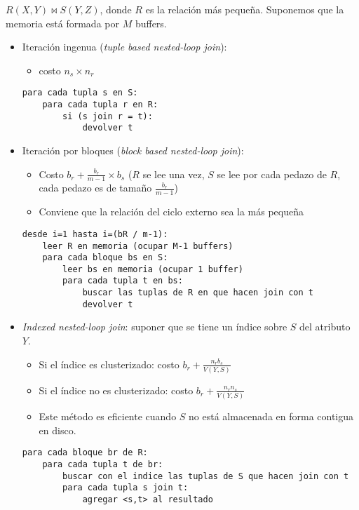\documentclass[a4paper, twoside]{article}
\begin{document}
$R(X,Y)\bowtie S(Y,Z)$, donde $R$ es la relación más pequeña. Suponemos
que la memoria está formada por $M$ buffers.
\begin{itemize}
\item Iteración ingenua (\emph{tuple based nested-loop join}): 

\begin{itemize}
\item costo $n_{s}\times n_{r}$
\end{itemize}

\begin{lstlisting}
para cada tupla s en S:
	para cada tupla r en R:
		si (s join r = t):
			devolver t
\end{lstlisting}


\item Iteración por bloques (\emph{block based nested-loop join}): 

\begin{itemize}
\item Costo $b_{r}+\frac{b_{r}}{m-1}\times b_{s}$ ($R$ se lee una vez,
$S$ se lee por cada pedazo de $R$, cada pedazo es de tamaño $\frac{b_{r}}{m-1}$)
\item Conviene que la relación del ciclo externo sea la más pequeña
\end{itemize}

\begin{lstlisting}
desde i=1 hasta i=(bR / m-1):
	leer R en memoria (ocupar M-1 buffers)
	para cada bloque bs en S:
		leer bs en memoria (ocupar 1 buffer)
		para cada tupla t en bs:
			buscar las tuplas de R en que hacen join con t
			devolver t
\end{lstlisting}


\item \emph{Indexed nested-loop join}: suponer que se tiene un índice sobre
$S$ del atributo $Y$.

\begin{itemize}
\item Si el índice es clusterizado: costo $b_{r}+\frac{n_{r}b_{s}}{V(Y,S)}$
\item Si el índice no es clusterizado: costo $b_{r}+\frac{n_{r}n_{s}}{V(Y,S)}$
\item Este método es eficiente cuando $S$ no está almacenada en forma contigua
en disco.
\end{itemize}

\begin{lstlisting}
para cada bloque br de R:
	para cada tupla t de br:
		buscar con el indice las tuplas de S que hacen join con t
		para cada tupla s join t:
			agregar <s,t> al resultado
\end{lstlisting}



\end{itemize}
\end{document}

